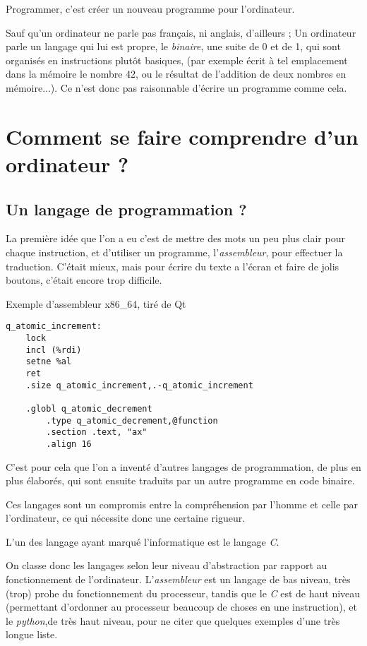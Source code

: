 Programmer, c'est créer un nouveau programme pour l'ordinateur.

Sauf qu'un ordinateur ne parle pas français, ni anglais, d'ailleurs ; Un ordinateur parle un
langage qui lui est propre, le \emph{binaire}, une suite de 0 et de 1, qui sont organisés en
instructions plutôt basiques, (par exemple écrit à tel emplacement dans la mémoire le
nombre 42, ou le résultat de l'addition de deux nombres en mémoire...). Ce n'est donc pas
raisonnable d'écrire un programme comme cela.
\section{Comment se faire comprendre d'un ordinateur ?}
\subsection{Un langage de programmation ?}
La première idée que l'on a eu c'est de mettre des mots un peu plus clair pour chaque
instruction, et d'utiliser un programme, l'\emph{assembleur}, pour effectuer la traduction. C'était
mieux, mais pour écrire du texte a l'écran et faire de jolis boutons, c'était encore trop
difficile.
\begin{listing}[h]
\caption{Exemple d'assembleur x86\_64, tiré de Qt}
\begin{verbatim}
q_atomic_increment:
    lock
    incl (%rdi)
    setne %al
    ret
    .size q_atomic_increment,.-q_atomic_increment

    .globl q_atomic_decrement
        .type q_atomic_decrement,@function
        .section .text, "ax"
        .align 16
\end{verbatim}
\end{listing}

C'est pour cela que l'on a inventé d'autres langages de programmation, de plus en plus
élaborés, qui sont ensuite traduits par un autre programme en code binaire.

Ces langages sont un compromis entre la compréhension par l'homme et celle par l'ordinateur, ce qui nécessite donc une certaine rigueur.

L'un des langage ayant marqué l'informatique est le langage \emph{C}.

On classe donc les langages selon leur niveau d'abstraction par rapport au
fonctionnement de l'ordinateur. L'\emph{assembleur} est un langage de bas niveau, très (trop)
prohe du fonctionnement du processeur, tandis que le \emph{C} est de haut niveau (permettant
d'ordonner au processeur beaucoup de choses en une instruction), et le \emph{python},de très
haut niveau, pour ne citer que quelques exemples d'une très longue liste.%

